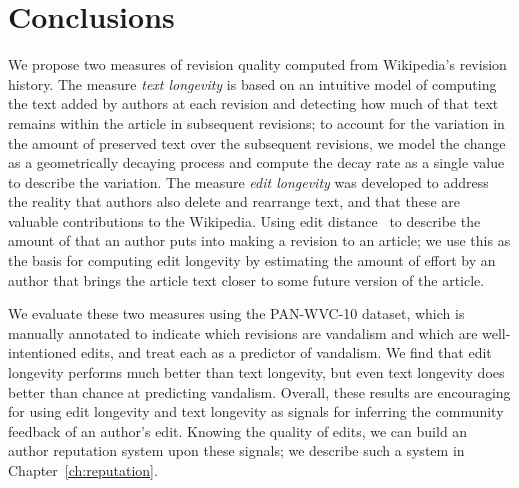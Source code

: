 \section{Conclusions}

We propose two measures of revision quality computed
from Wikipedia's revision history.
The measure \textit{text longevity} is based on an intuitive
model of computing the text added by authors at each revision
and detecting how much of that text remains within the article
in subsequent revisions; to account for the variation in
the amount of preserved text over the subsequent revisions,
we model the change as a geometrically decaying process
and compute the decay rate as a single value to describe
the variation.
The measure \textit{edit longevity} was developed to address
the reality that authors also delete and rearrange text,
and that these are valuable contributions to the Wikipedia.
Using edit distance~\cite{Levenshtein1966} to describe the
amount of  that an author puts into making a
revision to an article; we use this as the basis for computing
edit longevity by estimating the amount of effort by an
author that brings the article text closer to some future
version of the article.

We evaluate these two measures using the PAN-WVC-10 dataset, which is
manually annotated to indicate which revisions are vandalism and which
are well-intentioned edits, and treat each as a predictor of vandalism.
We find that edit longevity performs much better than text longevity,
but even text longevity does better than chance at predicting vandalism.
Overall, these results are encouraging for using edit longevity and text
longevity as signals for inferring the community feedback of an author's
edit.  Knowing the quality of edits, we can build an author reputation
system upon these signals; we describe such a system in
Chapter~\ref{ch:reputation}.

